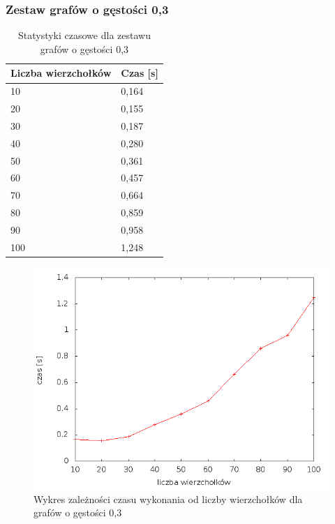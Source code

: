 \documentclass[12pt, a4paper]{article}
\begin{document}
\subsubsection*{Zestaw grafów o gęstości 0,3}
\begin{table}[H]
\caption{Statystyki czasowe dla zestawu grafów o gęstości 0,3}
\begin{center}
    \begin{tabular}{|l|l|}
    \hline
    Liczba wierzchołków & Czas [s] \\ \hline
    10 & 0,164 \\ \hline
    20 & 0,155 \\ \hline
    30 & 0,187 \\ \hline
    40 & 0,280 \\ \hline
    50 & 0,361 \\ \hline
    60 & 0,457 \\ \hline
    70 & 0,664 \\ \hline
    80 & 0,859 \\ \hline
    90 & 0,958 \\ \hline
    100 & 1,248 \\ \hline
    \end{tabular}
\end{center}
\end{table}

\begin{figure}[h]
    \begin{center}
	\includegraphics[scale=0.5]{results/img/den/den_03.png}
	\caption{Wykres zależności czasu wykonania od liczby wierzchołków dla grafów o gęstości 0,3}
    \end{center}
\end{figure}
\end{document}
